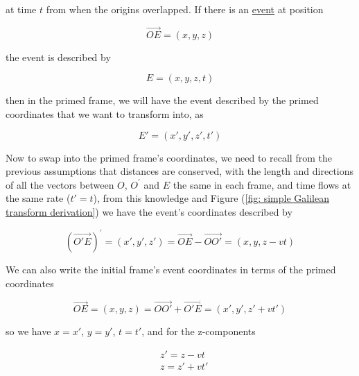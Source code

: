 at time ${t}$ from when the origins overlapped.
If there is an \hyperlink{def-event}{event} at position

\begin{equation}
	\vec{OE} = ({x},{y},{z})
\end{equation}

the event is described by

\begin{equation}
	E = ({x},{y},{z},{t})
\end{equation}

then in the primed frame, we will have the event described by the primed coordinates that we want to transform into, as

\begin{equation}
	E{'} = ({x{'}},{y{'}},{z{'}},t{'})
\end{equation}

Now to swap into the primed frame's coordinates, we need to recall from the previous assumptions that distances are conserved, with the length and directions of all the vectors between ${O}$, ${O^{'}}$ and ${E}$ the same in each frame, and time flows at the same rate (${t'} = {t}$), from this knowledge and Figure (\ref{fig: simple Galilean transform derivation}) we have the event's coordinates described by

\begin{equation}
	({\vec{O'E}})^{'} = ({x{'}},{y{'}},{z{'}}) = \vec{OE}-\vec{OO{'}} = ({x},{y},{z}-{v}{t})
	\label{eq: classical event}
\end{equation}

We can also write the initial frame's event coordinates in terms of the primed coordinates

\begin{equation}
	{\vec{OE}} = ({x},{y},{z}) = \vec{OO{'}} + \vec{O{'}E} = ({x{'}},{y{'}},{z{'}} + {v}{t{'}})
	\label{eq: classical event 2}
\end{equation}

so we have ${x} = {x{'}}$, ${y} = {y{'}}$, ${t} = {t{'}}$, and for the z-components

\begin{equation}
	\begin{aligned}
		 & {z{'}} = {z}-{v}{t}      \\
		 & {z} = {z{'}} + {v}{t{'}}
	\end{aligned}
\end{equation}

